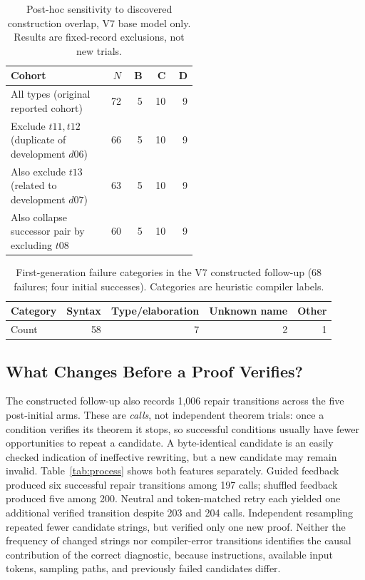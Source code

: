 \documentclass[runningheads,a4paper]{llncs}
\begin{document}
\begin{table}[t]\centering\small
\caption{Post-hoc sensitivity to discovered construction overlap, V7 base
model only. Results are fixed-record exclusions, not new trials.}
\label{tab:sensitivity}
\begin{tabular}{p{0.52\linewidth}rrrr}\toprule
Cohort & $N$ & B & C & D\\\midrule
All types (original reported cohort) &72&5&10&9\\
Exclude $t11,t12$ (duplicate of development $d06$) &66&5&10&9\\
Also exclude $t13$ (related to development $d07$) &63&5&10&9\\
Also collapse successor pair by excluding $t08$ &60&5&10&9\\
\bottomrule\end{tabular}
\end{table}

\begin{table}[t]\centering\small
\caption{First-generation failure categories in the V7 constructed follow-up
(68 failures; four initial successes). Categories are heuristic compiler labels.}
\begin{tabular}{lrrrr}\toprule
Category & Syntax & Type/elaboration & Unknown name & Other \\
\midrule
Count & 58 & 7 & 2 & 1 \\
\bottomrule\end{tabular}
\end{table}

\subsection{What Changes Before a Proof Verifies?}
The constructed follow-up also records 1,006 repair transitions across the
five post-initial arms. These are \emph{calls}, not independent theorem trials:
once a condition verifies its theorem it stops, so successful conditions
usually have fewer opportunities to repeat a candidate. A byte-identical
candidate is an easily checked indication of ineffective rewriting, but a
new candidate may remain invalid. Table~\ref{tab:process} shows both
features separately. Guided feedback produced six successful repair
transitions among 197 calls; shuffled feedback produced five among 200.
Neutral and token-matched retry each yielded one additional verified
transition despite 203 and 204 calls. Independent resampling repeated fewer
candidate strings, but verified only one new proof. Neither the frequency
of changed strings nor compiler-error transitions identifies the causal
contribution of the correct diagnostic, because instructions, available
input tokens, sampling paths, and previously failed candidates differ.
\end{document}

